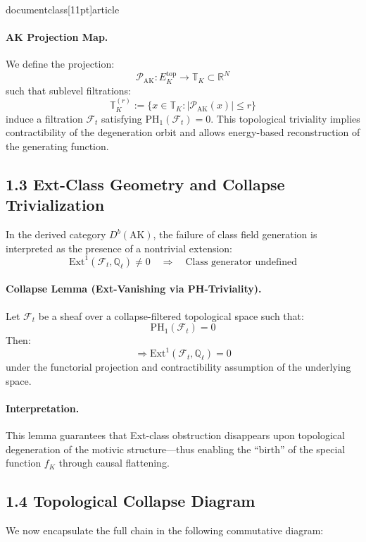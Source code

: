 \\documentclass[11pt]{article}
\begin{document}
\paragraph{AK Projection Map.}
We define the projection:
\[
\mathcal{P}_{\text{AK}}: E_K^{\mathrm{top}} \rightarrow \mathbb{T}_K \subset \mathbb{R}^N
\]
such that sublevel filtrations:
\[
\mathbb{T}_K^{(r)} := \{ x \in \mathbb{T}_K : |\mathcal{P}_{\text{AK}}(x)| \leq r \}
\]
induce a filtration \( \mathcal{F}_t \) satisfying \( \mathrm{PH}_1(\mathcal{F}_t) = 0 \). This topological triviality implies contractibility of the degeneration orbit and allows energy-based reconstruction of the generating function.

\subsection*{1.3 Ext-Class Geometry and Collapse Trivialization}

In the derived category \( D^b(\text{AK}) \), the failure of class field generation is interpreted as the presence of a nontrivial extension:
\[
\mathrm{Ext}^1(\mathcal{F}_t, \mathbb{Q}_\ell) \neq 0 \quad \Rightarrow \quad \text{Class generator undefined}
\]

\paragraph{Collapse Lemma (Ext-Vanishing via PH-Triviality).}
Let \( \mathcal{F}_t \) be a sheaf over a collapse-filtered topological space such that:
\[
\mathrm{PH}_1(\mathcal{F}_t) = 0
\]
Then:
\[
\Rightarrow \mathrm{Ext}^1(\mathcal{F}_t, \mathbb{Q}_\ell) = 0
\]
under the functorial projection and contractibility assumption of the underlying space.

\paragraph{Interpretation.}
This lemma guarantees that Ext-class obstruction disappears upon topological degeneration of the motivic structure—thus enabling the “birth” of the special function \( f_K \) through causal flattening.

\subsection*{1.4 Topological Collapse Diagram}

We now encapsulate the full chain in the following commutative diagram:
\end{document}
